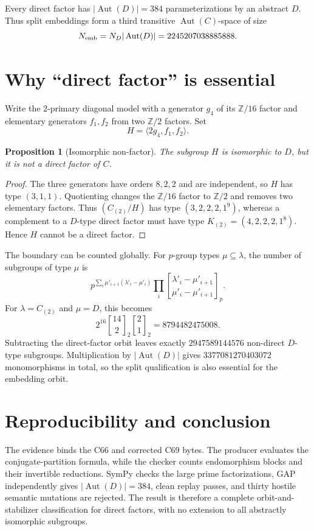 \documentclass[10pt]{article}
\newtheorem{proposition}{Proposition}
\newcommand{\Z}{\mathbb Z}
\newcommand{\Aut}{\operatorname{Aut}}
\begin{document}
Every direct factor has $|\Aut(D)|=384$ parameterizations by an abstract $D$.
Thus split embeddings form a third transitive $\Aut(C)$-space of size
\[
 N_{\rm emb}=N_D|\Aut(D)|=2245207038885888.
\]

\section{Why ``direct factor'' is essential}
Write the $2$-primary diagonal model with a generator $g_4$ of its $\Z/16$
factor and elementary generators $f_1,f_2$ from two $\Z/2$ factors.  Set
\[
 H=\langle2g_4,f_1,f_2\rangle.
\]

\begin{proposition}[Isomorphic non-factor]
The subgroup $H$ is isomorphic to $D$, but it is not a direct factor of $C$.
\end{proposition}

\begin{proof}
The three generators have orders $8,2,2$ and are independent, so $H$ has type
$(3,1,1)$.  Quotienting changes the $\Z/16$ factor to $\Z/2$ and removes two
elementary factors.  Thus $(C_{(2)}/H)$ has type
$(3,2,2,2,1^9)$, whereas a complement to a $D$-type direct factor must have
type $K_{(2)}=(4,2,2,2,1^8)$.  Hence $H$ cannot be a direct factor.
\end{proof}

The boundary can be counted globally.  For $p$-group types $\mu\subseteq
\lambda$, the number of subgroups of type $\mu$ is
\[
 p^{\sum_i\mu'_{i+1}(\lambda'_i-\mu'_i)}
 \prod_i
 \genfrac{[}{]}{0pt}{}{\lambda'_i-\mu'_{i+1}}
 {\mu'_i-\mu'_{i+1}}_p.
\]
For $\lambda=C_{(2)}$ and $\mu=D$, this becomes
\[
 2^{16}\genfrac{[}{]}{0pt}{}{14}{2}_2
 \genfrac{[}{]}{0pt}{}{2}{1}_2
 =8794482475008.
\]
Subtracting the direct-factor orbit leaves exactly $2947589144576$
non-direct $D$-type subgroups.  Multiplication by $|\Aut(D)|$ gives
$3377081270403072$ monomorphisms in total, so the split qualification is also
essential for the embedding orbit.

\section{Reproducibility and conclusion}
The evidence binds the C66 and corrected C69 bytes.  The producer evaluates
the conjugate-partition formula, while the checker counts endomorphism blocks
and their invertible reductions.  SymPy checks the large prime factorizations,
GAP independently gives $|\Aut(D)|=384$, clean replay passes, and thirty
hostile semantic mutations are rejected.  The result is therefore a complete
orbit-and-stabilizer classification for direct factors, with no extension to
all abstractly isomorphic subgroups.
\end{document}
